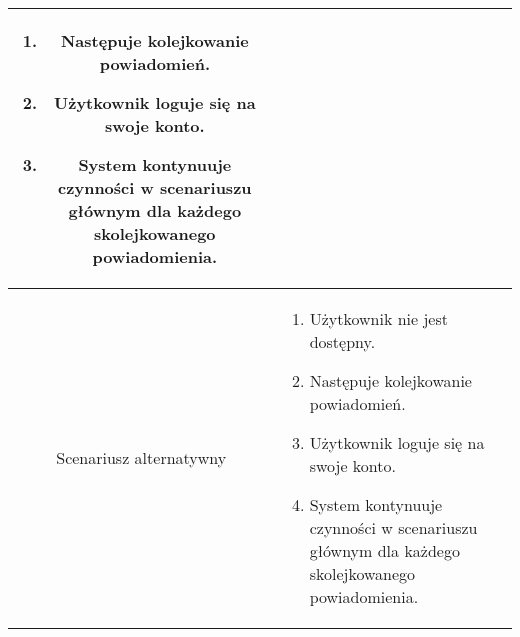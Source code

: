 \documentclass{article}
\begin{document}
\begin{enumerate}
\begin{enumerate}
\begin{table}[H]
\begin{tabular}{|c|p{7cm}|}
\begin{enumerate}
\item Następuje kolejkowanie powiadomień.

\item Użytkownik loguje się na swoje konto.

\item System kontynuuje czynności w scenariuszu głównym dla każdego skolejkowanego powiadomienia.\end{enumerate} \\
						\hline
						Scenariusz alternatywny & \begin{enumerate}\item Użytkownik nie jest dostępny.

\item Następuje kolejkowanie powiadomień.

\item Użytkownik loguje się na swoje konto.

\item System kontynuuje czynności w scenariuszu głównym dla każdego skolejkowanego powiadomienia.\end{enumerate} \\
						\hline
					\end{tabular}
				\end{table}


\end{enumerate}
\end{enumerate}
\end{document}
